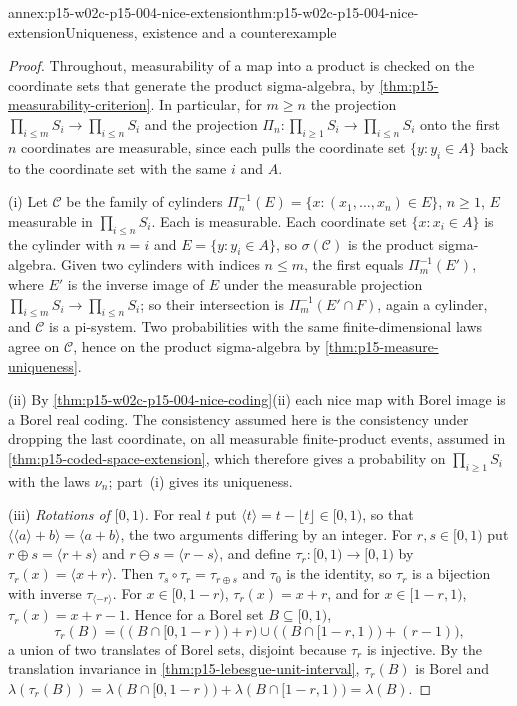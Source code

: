 \begin{annexitem}{annex:p15-w02c-p15-004-nice-extension}{thm:p15-w02c-p15-004-nice-extension}{Uniqueness, existence and a counterexample}
\begin{proof}
Throughout, measurability of a map into a product is checked on the
coordinate sets that generate the product sigma-algebra, by
\cref{thm:p15-measurability-criterion}. In particular, for \(m\geq n\)
the projection \(\prod_{i\leq m}S_i\to\prod_{i\leq n}S_i\) and the
projection \(\Pi_n:\prod_{i\geq1}S_i\to\prod_{i\leq n}S_i\) onto the first
\(n\) coordinates are measurable, since each pulls the coordinate set
\(\{y:y_i\in A\}\) back to the coordinate set with the same \(i\) and
\(A\).

(i) Let \(\mathcal C\) be the family of cylinders
\(\Pi_n^{-1}(E)=\{x:(x_1,\ldots,x_n)\in E\}\), \(n\geq1\), \(E\)
measurable in \(\prod_{i\leq n}S_i\). Each is measurable. Each coordinate
set \(\{x:x_i\in A\}\) is the cylinder with \(n=i\) and
\(E=\{y:y_i\in A\}\), so \(\sigma(\mathcal C)\) is the product
sigma-algebra. Given two cylinders with indices \(n\leq m\), the first
equals \(\Pi_m^{-1}(E')\), where \(E'\) is the inverse image of \(E\)
under the measurable projection \(\prod_{i\leq m}S_i\to\prod_{i\leq n}S_i\);
so their intersection is \(\Pi_m^{-1}(E'\cap F)\), again a cylinder, and
\(\mathcal C\) is a pi-system. Two probabilities with the same
finite-dimensional laws agree on \(\mathcal C\), hence on the product
sigma-algebra by \cref{thm:p15-measure-uniqueness}.

(ii) By \cref{thm:p15-w02c-p15-004-nice-coding}(ii) each nice map with
Borel image is a Borel real coding. The consistency assumed here is the
consistency under dropping the last coordinate, on all measurable
finite-product events, assumed in \cref{thm:p15-coded-space-extension},
which therefore gives a probability on \(\prod_{i\geq1}S_i\) with the laws
\(\nu_n\); part~(i) gives its uniqueness.

(iii) \emph{Rotations of \([0,1)\).} For real \(t\) put
\(\langle t\rangle=t-\lfloor t\rfloor\in[0,1)\), so that
\(\langle\langle a\rangle+b\rangle=\langle a+b\rangle\), the two
arguments differing by an integer. For \(r,s\in[0,1)\) put
\(r\oplus s=\langle r+s\rangle\) and \(r\ominus s=\langle r-s\rangle\),
and define \(\tau_r:[0,1)\to[0,1)\) by \(\tau_r(x)=\langle x+r\rangle\).
Then \(\tau_s\circ\tau_r=\tau_{r\oplus s}\) and \(\tau_0\) is the
identity, so \(\tau_r\) is a bijection with inverse
\(\tau_{\langle-r\rangle}\). For \(x\in[0,1-r)\), \(\tau_r(x)=x+r\), and for
\(x\in[1-r,1)\), \(\tau_r(x)=x+r-1\). Hence for a Borel set
\(B\subseteq[0,1)\),
\[
 \tau_r(B)=\bigl((B\cap[0,1-r))+r\bigr)\cup\bigl((B\cap[1-r,1))+(r-1)\bigr),
\]
a union of two translates of Borel sets, disjoint because \(\tau_r\) is
injective. By the translation invariance in
\cref{thm:p15-lebesgue-unit-interval}, \(\tau_r(B)\) is Borel and
\(\lambda(\tau_r(B))=\lambda(B\cap[0,1-r))+\lambda(B\cap[1-r,1))=\lambda(B)\).


\end{proof}
\end{annexitem}
